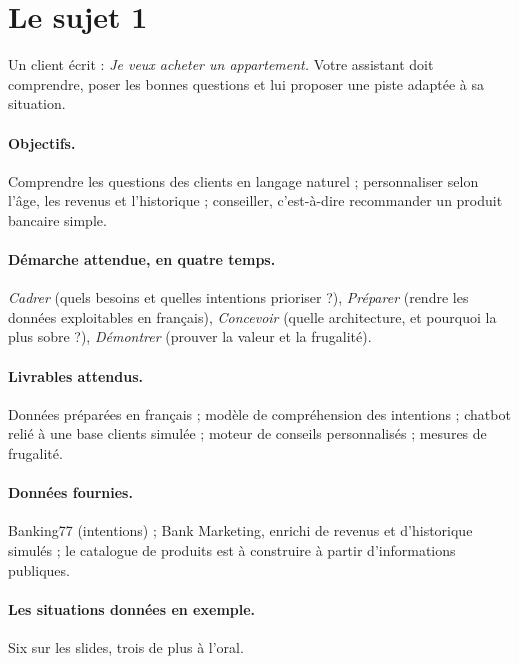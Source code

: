 \section{Le sujet 1}

\begin{cle}
\og Un client écrit : \emph{Je veux acheter un appartement.} Votre assistant doit comprendre, poser
les bonnes questions et lui proposer une piste adaptée à sa situation. \fg
\end{cle}

\paragraph{Objectifs.} Comprendre les questions des clients en langage naturel ; personnaliser
selon l'âge, les revenus et l'historique ; conseiller, c'est-à-dire recommander un produit bancaire
simple.

\paragraph{Démarche attendue, en quatre temps.} \emph{Cadrer} (quels besoins et quelles intentions
prioriser ?), \emph{Préparer} (rendre les données exploitables en français), \emph{Concevoir}
(quelle architecture, et pourquoi la plus sobre ?), \emph{Démontrer} (prouver la valeur et la
frugalité).

\paragraph{Livrables attendus.} Données préparées en français ; modèle de compréhension des
intentions ; chatbot relié à une base clients simulée ; moteur de conseils personnalisés ; mesures
de frugalité.

\paragraph{Données fournies.} Banking77 (intentions) ; Bank Marketing, \og enrichi de revenus et
d'historique simulés \fg{} ; le catalogue de produits est à construire à partir d'informations
publiques.

\paragraph{Les situations données en exemple.} Six sur les slides, trois de plus à l'oral.

